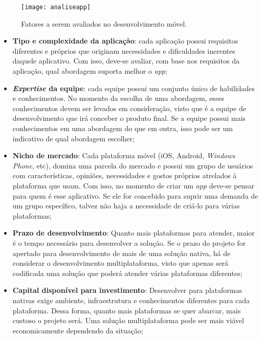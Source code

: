 \begin{figure}[H]
	\centering
	\texttt{[image: analiseapp]}
	\caption[Fatores a serem avaliados no desenvolvimento móvel]{ Fatores a serem avaliados no desenvolvimento móvel.}
	\label{fig:analiseapp}
\end{figure}

\begin{itemize}
    \item \textbf{Tipo e complexidade da aplicação}: cada aplicação possui requisitos diferentes e próprios que originam necessidades e dificuldades inerentes daquele aplicativo. Com isso, deve-se avaliar,
    com base nos requisitos da aplicação, qual abordagem suporta melhor o \textit{app};
    \item \textbf{\textit{Expertise} da equipe}: cada equipe possui um conjunto único de habilidades e conhecimentos. No momento da escolha de uma abordagem, esses conhecimentos
    devem ser levados em consideração, visto que é a equipe de desenvolvimento que irá conceber o produto final. Se a equipe possui mais conhecimentos em uma abordagem do que em outra, isso pode ser 
    um indicativo de qual abordagem escolher;
    \item \textbf{Nicho de mercado}: Cada plataforma móvel (iOS, Android, \textit{Windows Phone}, etc), domina uma parcela do mercado e possui um grupo de usuários com 
    características, opiniões, necessidades e gostos próprios atrelados à plataforma que usam. Com isso, no momento de criar um \textit{app} deve-se pensar para quem é esse aplicativo. Se ele for concebido 
    para suprir uma demanda de um grupo específico, talvez não haja a necessidade de criá-lo para várias plataformas;
    \item \textbf{Prazo de desenvolvimento}: Quanto mais plataformas para atender, maior é o tempo necessário para desenvolver a solução. Se o prazo do projeto for apertado para desenvolvimento de mais de uma solução 
    nativa, há de considerar o desenvolvimento multiplataforma, visto que apenas será codificada uma solução que poderá atender várias plataformas diferentes;
    \item \textbf{Capital disponível para investimento}: Desenvolver para plataformas nativas exige ambiente, infraestrutura e conhecimentos diferentes para cada plataforma. Dessa forma, quanto mais plataformas se 
    quer abarcar, mais custoso o projeto será. Uma solução multiplataforma pode ser mais viável economicamente dependendo da situação;
\end{itemize}

